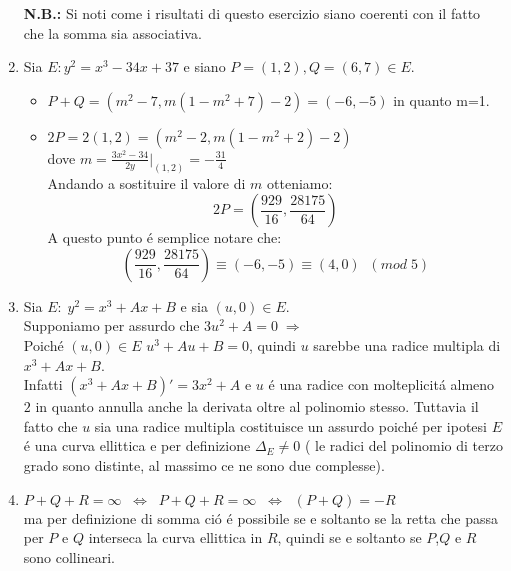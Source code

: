 \documentclass[a4paper]{article}
\newcommand{\ds}{\displaystyle}
\begin{document}
\begin{enumerate}
\begin{enumerate}
\end{enumerate}
\textbf{N.B.:} Si noti come i risultati di questo esercizio siano coerenti con il fatto che la somma sia associativa.



\item Sia $E: y^2=x^3-34x+37$ e siano $P=(1,2),Q=(6,7)\in E$.\\
\begin{itemize}
\item $P+Q=(m^2-7,m(1-m^2+7)-2)=(-6,-5)$ in quanto m=1.
\item $2P=2(1,2)=(m^2-2,m(1-m^2+2)-2)$\\
dove $m=\ds{\frac{3x^2-34}{2y}|_{(1,2)}=-\frac{31}{4}}$\\
Andando a sostituire il valore di $m$ otteniamo:\\
$$2P=\ds{\left(\frac{929}{16},\frac{28175}{64}\right)}$$
A questo punto \'e semplice notare che:\\
$$\ds{\left(\frac{929}{16},\frac{28175}{64}\right)\equiv(-6,-5)\equiv(4,0)\;\;(mod\;5)}$$
\end{itemize}




\item Sia $E: \; y^2=x^3+Ax+B$ e sia $(u,0)\in E$.\\
Supponiamo per assurdo che $3u^2+A=0\;\Rightarrow$\\
Poich\'e $(u,0)\in E$ $u^3+Au+B=0$, quindi $u$ sarebbe una radice multipla di $x^3+Ax+B$. \\
Infatti $(x^3+Ax+B)'=3x^2+A$ e $u$ \'e una radice con molteplicit\'a almeno $2$ in quanto annulla anche la derivata oltre al polinomio stesso. Tuttavia il fatto che $u$ sia una radice multipla costituisce un assurdo 
poich\'e per ipotesi $E$ \'e una curva ellittica e per definizione $\Delta_E\neq 0$ ( le radici del polinomio di terzo grado sono distinte, al massimo ce ne sono due complesse).\\



\item $P+Q+R=\infty \;\; \Leftrightarrow \;\; P+Q+R=\infty \;\; \Leftrightarrow \;\; (P+Q)=-R$\\
ma per definizione di somma ci\'o \'e possibile se e soltanto se la retta che passa per $P$ e $Q$ interseca la curva ellittica in $R$, quindi se e soltanto se $P$,$Q$ e $R$ sono collineari.


\end{enumerate}
\end{document}
